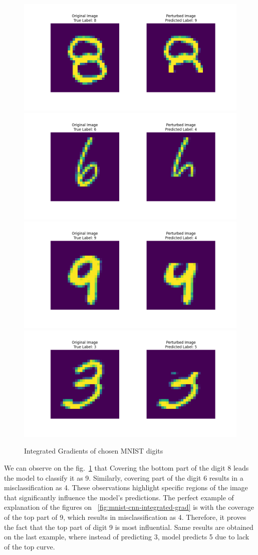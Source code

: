 \documentclass[journal, a4paper]{IEEEtran}
\begin{document}
\begin{figure}[ht]\centering
    \includegraphics[width=.6\linewidth]{img/counterfacts/MNIST/cover_bottom/img_1}
    \includegraphics[width=.6\linewidth]{img/counterfacts/MNIST/cover_bottom/img_3}
    \includegraphics[width=.6\linewidth]{img/counterfacts/MNIST/cover_top/img_10}
    \includegraphics[width=.6\linewidth]{img/counterfacts/MNIST/cover_top/img_3}
    \caption{Integrated Gradients of chosen MNIST digits}\label{fig:mnist-cnn-counterfacts}
\end{figure}

We can observe on the fig.~\ref{fig:mnist-cnn-counterfacts} that Covering the bottom part of the digit 8 leads the model to classify it as 9.
Similarly, covering part of the digit 6 results in a misclassification as 4.
These observations highlight specific regions of the image that significantly influence the model's predictions.
The perfect example of explanation of the figures on ~\ref{fig:mnist-cnn-integrated-grad} is with the coverage of the top part of 9, which results in misclassification as 4.
Therefore, it proves the fact that the top part of digit 9 is most influential.
Same results are obtained on the last example, where instead of predicting 3, model predicts 5 due to lack of the top curve.
\end{document}
